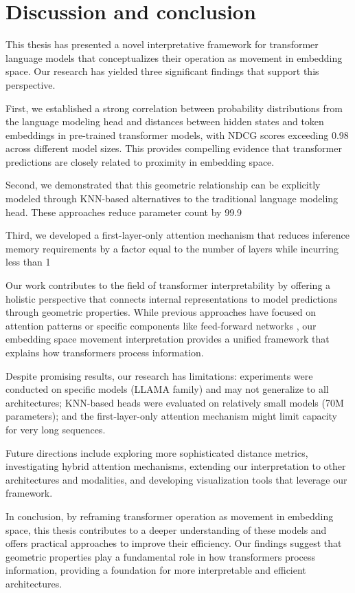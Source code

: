 \chapter{Discussion and conclusion}

This thesis has presented a novel interpretative framework for transformer language models that conceptualizes their operation as movement in embedding space. Our research has yielded three significant findings that support this perspective.

First, we established a strong correlation between probability distributions from the language modeling head and distances between hidden states and token embeddings in pre-trained transformer models, with NDCG scores exceeding 0.98 across different model sizes. This provides compelling evidence that transformer predictions are closely related to proximity in embedding space.

Second, we demonstrated that this geometric relationship can be explicitly modeled through KNN-based alternatives to the traditional language modeling head. These approaches reduce parameter count by 99.9%

Third, we developed a first-layer-only attention mechanism that reduces inference memory requirements by a factor equal to the number of layers while incurring less than 1%

Our work contributes to the field of transformer interpretability by offering a holistic perspective that connects internal representations to model predictions through geometric properties. While previous approaches have focused on attention patterns \cite{aken2020visbert} or specific components like feed-forward networks \cite{geva2022transformer}, our embedding space movement interpretation provides a unified framework that explains how transformers process information.

Despite promising results, our research has limitations: experiments were conducted on specific models (LLAMA family) and may not generalize to all architectures; KNN-based heads were evaluated on relatively small models (70M parameters); and the first-layer-only attention mechanism might limit capacity for very long sequences.

Future directions include exploring more sophisticated distance metrics, investigating hybrid attention mechanisms, extending our interpretation to other architectures and modalities, and developing visualization tools that leverage our framework.

In conclusion, by reframing transformer operation as movement in embedding space, this thesis contributes to a deeper understanding of these models and offers practical approaches to improve their efficiency. Our findings suggest that geometric properties play a fundamental role in how transformers process information, providing a foundation for more interpretable and efficient architectures.
